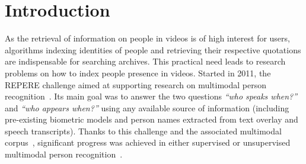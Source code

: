 \section{Introduction}

As the retrieval of information on people in videos is of high interest for users, algorithms indexing identities of people and retrieving their respective quotations are indispensable for searching archives. This practical need leads to research problems on how to index people presence in videos.
%
%
%
Started in 2011, the REPERE challenge aimed at supporting research on multimodal person recognition~\cite{BERNARD--SLAM--2013, GIRAUDEL--LREC--2012}. Its main goal was to answer the two questions \emph{``who speaks when?''} and \emph{``who appears when?''} using any available source of information (including pre-existing biometric models and person names extracted from text overlay and speech transcripts). 
%
Thanks to this challenge and the associated multimodal corpus~\cite{GIRAUDEL--LREC--2012}, significant progress was achieved in either supervised or unsupervised multimodal person recognition~\cite{BECHET--INTERSPEECH--2014, BREDIN--IJMIR--2014, GAY--CBMI--2014, poignant2012fusion, POIGNANT--MTAP--2015, ROUVIER--CBMI--2014}.

